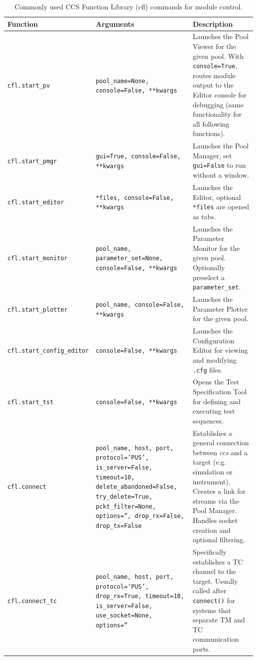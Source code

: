 \begin{table}[h!]
\centering
\renewcommand{\arraystretch}{1.3}
\setlength{\tabcolsep}{8pt}
\begin{tabular}{p{4cm} p{5cm} p{6cm}}
\hline
\textbf{Function} & \textbf{Arguments} & \textbf{Description} \\ 
\hline


\texttt{cfl.start\_pv} & \texttt{pool\_name=None, console=False, **kwargs} & Launches the Pool Viewer for the given pool. With \texttt{console=True}, routes module output to the Editor console for debugging (same functionality for all following functions). \\

\texttt{cfl.start\_pmgr} & \texttt{gui=True, console=False, **kwargs} & Launches the Pool Manager, set \texttt{gui=False} to run without a window. \\

\texttt{cfl.start\_editor} & \texttt{*files, console=False, **kwargs} & Launches the Editor, optional \texttt{*files} are opened as tabs.\\

\texttt{cfl.start\_monitor} & \texttt{pool\_name, parameter\_set=None, console=False, **kwargs} & Launches the Parameter Monitor for the given pool. Optionally preselect a \texttt{parameter\_set}. \\

\texttt{cfl.start\_plotter} & \texttt{pool\_name, console=False, **kwargs} & Launches the Parameter Plotter for the given pool. \\

\texttt{cfl.start\_config\_editor} & \texttt{console=False, **kwargs} & Launches the Configuration Editor for viewing and modifying \texttt{.cfg} files. \\

\texttt{cfl.start\_tst} & \texttt{console=False, **kwargs} & Opens the Test Specification Tool for defining and executing test sequences.\\

\texttt{cfl.connect} & \texttt{pool\_name, host, port, protocol='PUS', is\_server=False, timeout=10, delete\_abandoned=False, try\_delete=True, pckt\_filter=None, options='', drop\_rx=False, drop\_tx=False} & Establishes a general connection between \textit{ccs} and a target (e.g. simulation or instrument). Creates a link for streams via the Pool Manager. Handles socket creation and optional filtering. \\

\texttt{cfl.connect\_tc} & \texttt{pool\_name, host, port, protocol='PUS', drop\_rx=True, timeout=10, is\_server=False, use\_socket=None, options=''} & Specifically establishes a TC channel to the target. Usually called after \texttt{connect()} for systems that separate TM and TC communication ports. \\


\hline
\end{tabular}
\caption{Commonly used CCS Function Library (cfl) commands for module control.}
\end{table}


